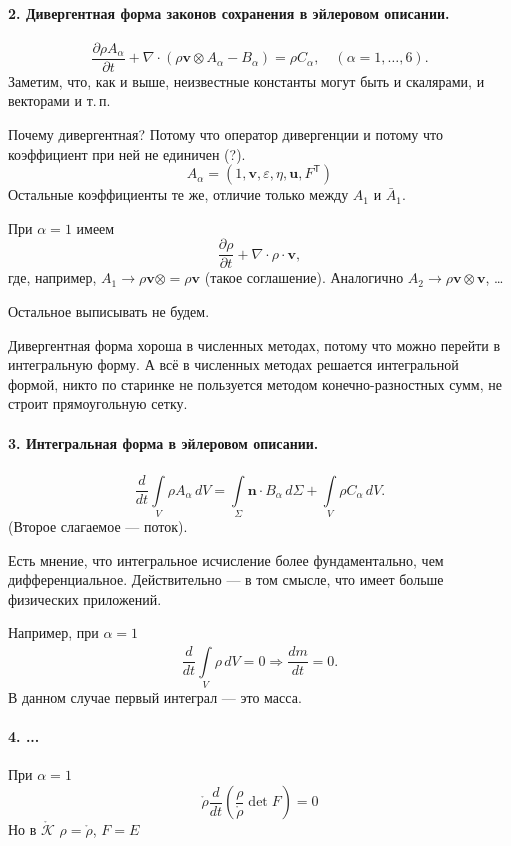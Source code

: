 \paragraph{2. Дивергентная форма законов сохранения в эйлеровом описании.}
\[\boxed{
  \frac{\partial \rho A_\alpha}{\partial t} + \nabla \cdot (\rho \mathbf{v}
\otimes A_\alpha - B_\alpha) = \rho C_\alpha, \quad (\alpha = 1, \ldots, 6).
}
\]
Заметим, что, как и выше, неизвестные константы могут быть и скалярами, и
векторами и т.\,п. 

Почему дивергентная? Потому что оператор дивергенции и потому что коэффициент
при ней не единичен (?).  
\[
  A_\alpha = (1, \mathbf{v}, \varepsilon, \eta, \mathbf{u}, F^{\mathsf T})
\]
Остальные коэффициенты те же, отличие только между $ A_1 $ и $ \bar{A}_1 $.

При $ \alpha = 1 $ имеем  
\[
  \frac{\partial \rho}{\partial t} + \nabla \cdot \rho \cdot \mathbf{v},
\]
где, например, $ A_1 \to \rho \mathbf{v} \otimes = \rho \mathbf{v} $ (такое соглашение).
Аналогично $ A_2 \to \rho \mathbf{v} \otimes \mathbf{v} $, \ldots

Остальное выписывать не будем.

Дивергентная форма хороша в численных методах, потому что можно перейти в
интегральную форму. А всё в численных методах решается интегральной формой,
никто по старинке не пользуется методом конечно-разностных сумм, не строит
прямоугольную сетку.

\paragraph{3. Интегральная форма в эйлеровом описании.}  
\[
  \frac{d}{dt} \int\limits_{V}^{} \rho A_\alpha\,d V =
  \int\limits_{\Sigma}^{}\mathbf{n} \cdot B_\alpha\,d\Sigma +
  \int\limits_{V}^{}\rho C_\alpha\,dV.
\]
(Второе слагаемое --- поток). 

Есть мнение, что интегральное исчисление более фундаментально, чем
дифференциальное. Действительно --- в том смысле, что имеет больше физических
приложений.

Например, при $ \alpha = 1 $ 
\[
    \frac{d}{dt}\int\limits_{V}^{}\rho\,dV = 0 \Rightarrow \frac{dm}{dt} = 0.
\]
В данном случае первый интеграл --- это масса.

\paragraph{4. ...}

При $ \alpha = 1 $  
\[
  \mathring{\rho} \frac{d}{dt} \left( \frac{\rho}{\mathring{\rho}}\det F \right)
  = 0 
\]
Но в $ \mathring{\mathcal K} $ $ \rho = \mathring{\rho} $, $ F = E $ %
 
